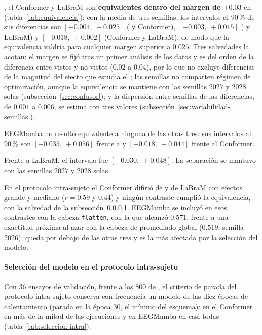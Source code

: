 \eegnet{}, el Conformer y LaBraM son \textbf{equivalentes dentro del margen de $\pm 0.03$} en
\loso{} (tabla~\ref{tab:equivalencia}): con la media de tres semillas, los intervalos al $90$\,\% de
sus diferencias son $[+0.004,\ +0.025]$ (\eegnet{} y Conformer), $[-0.003,\ +0.015]$ (\eegnet{} y
LaBraM) y $[-0.018,\ +0.002]$ (Conformer y LaBraM), de modo que la equivalencia valdría para cualquier
margen superior a $0.025$. Tres salvedades la acotan: el margen se fijó tras un primer análisis de los
datos y es del orden de la diferencia entre vistos y no vistos ($0.02$ a $0.04$), por lo que no excluye
diferencias de la magnitud del efecto que estudia el \dsi{}; las semillas no comparten régimen de
optimización, aunque la equivalencia se mantiene con las semillas $2027$ y $2028$ solas
(subsección~\ref{sec:confusor}); y la dispersión entre semillas de las diferencias, de $0.001$ a $0.006$,
se estima con tres valores (subsección~\ref{sec:variabilidad-semillas}).

EEGMamba no resultó equivalente a ninguna de las otras tres: sus intervalos al $90$\,\% son
$[+0.035,\ +0.056]$ frente a \eegnet{} y $[+0.018,\ +0.044]$ frente al Conformer.

Frente a LaBraM, el intervalo fue $[+0.030,\ +0.048]$. La separación se mantuvo con las semillas $2027$ y $2028$ solas.

En el protocolo intra-sujeto el Conformer difirió de \eegnet{} y de LaBraM con efectos grande y mediano
($r = 0.59$ y $0.44$) y ningún contraste cumplió la equivalencia, con la salvedad de la
subsección~\ref{sec:seleccion-intra}. EEGMamba se incluyó en esos contrastes con la cabeza \texttt{flatten},
con la que alcanzó $0.571$, frente a una exactitud próxima al azar con la cabeza de promediado global
($0.519$, semilla 2026); queda por debajo de las otras tres y es la más afectada por la selección del
modelo.

\paragraph{Selección del modelo en el protocolo intra-sujeto}
\label{sec:seleccion-intra}

Con $36$ ensayos de validación, frente a los $800$ de \loso{}, el criterio de parada del protocolo
intra-sujeto conserva con frecuencia un modelo de las diez épocas de calentamiento (parada en la
época $30$, el mínimo del esquema): en el Conformer en más de la mitad de las ejecuciones y en
EEGMamba en casi todas (tabla~\ref{tab:seleccion-intra}).

